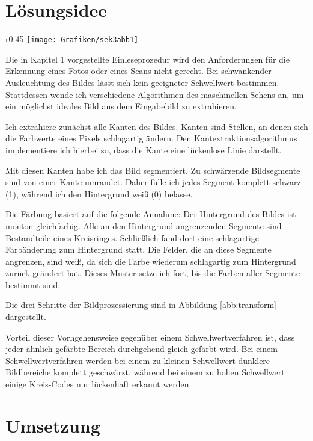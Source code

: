 \section{Lösungsidee}
\begin{wrapfigure}{r}{0.45\textwidth}
	\setlength\intextsep{0pt}
	\centering	
	\texttt{[image: Grafiken/sek3abb1]}
	\caption{Verbesserte Bilderkennung}
	\label{abb:transform}
\end{wrapfigure}
Die in Kapitel 1 vorgestellte Einleseprozedur wird den Anforderungen für die Erkennung eines Fotos oder eines Scans nicht gerecht. Bei schwankender Ausleuchtung des Bildes lässt sich kein geeigneter Schwellwert bestimmen. Stattdessen wende ich verschiedene Algorithmen des maschinellen Sehens an, um ein möglichst ideales Bild aus dem Eingabebild zu extrahieren.

Ich extrahiere zunächst alle Kanten des Bildes. Kanten sind Stellen, an denen sich die Farbwerte eines Pixels schlagartig ändern. Den Kantextraktionsalgorithmus implementiere ich hierbei so, dass die Kante eine lückenlose Linie darstellt.

Mit diesen Kanten habe ich das Bild segmentiert. Zu schwärzende Bildsegmente sind von einer Kante umrandet. Daher fülle ich jedes Segment komplett schwarz (1), während ich den Hintergrund weiß (0) belasse.

Die Färbung basiert auf die folgende Annahme: Der Hintergrund des Bildes ist monton gleichfarbig. Alle an den Hintergrund angrenzenden Segmente sind Bestandteile eines Kreisringes. Schließlich fand dort eine schlagartige Farbänderung zum Hintergrund statt. Die Felder, die an diese Segmente angrenzen, sind weiß, da sich die Farbe wiederum schlagartig zum Hintergrund zurück geändert hat. Dieses Muster setze ich fort, bis die Farben aller Segmente bestimmt sind.

Die drei Schritte der Bildprozessierung sind in Abbildung \ref{abb:transform} dargestellt.

Vorteil dieser Vorhgehensweise gegenüber einem Schwellwertverfahren ist, dass jeder ähnlich gefärbte Bereich durchgehend gleich gefärbt wird. Bei einem Schwellwertverfahren werden bei einem zu kleinen Schwellwert dunklere Bildbereiche komplett geschwärzt, während bei einem zu hohen Schwellwert einige Kreis-Codes nur lückenhaft erkannt werden.
 
\section{Umsetzung}
